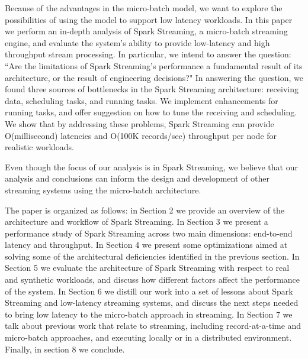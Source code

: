 
Because of the advantages in the micro-batch model, we want to explore the possibilities of using the model to support low latency workloads. In this paper we perform an in-depth analysis of Spark Streaming, a micro-batch streaming engine, and evaluate the system's ability to provide low-latency and high throughput stream processing.
In particular, we intend to answer the question: ``Are the limitations of Spark Streaming's performance a fundamental result of its architecture, or the result of engineering decisions?"
In answering the question, we found three sources of bottlenecks in the Spark Streaming architecture: receiving data, scheduling tasks, and running tasks. We implement enhancements for running tasks, and offer suggestion on how to tune the receiving and scheduling. We show that by addressing these problems, Spark Streaming can provide O(millisecond) latencies and O(100K records/sec) throughput per node for realistic workloads.

Even though the focus of our analysis is in Spark Streaming, we believe that our analysis and conclusions can inform the design and development of other streaming systems using the micro-batch architecture.

The paper is organized as follows: 
in Section 2 we provide an overview of the architecture and workflow of Spark Streaming. 
In Section 3 we present a performance study of Spark Streaming across two main dimensions: end-to-end latency and throughput.
In Section 4 we present some optimizations aimed at solving some of the architectural deficiencies identified in the previous section.
In Section 5 we evaluate the architecture of Spark Streaming with respect to real and synthetic workloads, and discuss how different factors affect the performance of the system.
In Section 6 we distill our work into a set of lessons about Spark Streaming and low-latency streaming systems, and discuss the next steps needed to bring low latency to the micro-batch approach in streaming.
In Section 7 we talk about previous work that relate to streaming, including record-at-a-time and micro-batch approaches, and executing locally or in a distributed environment.
Finally, in section 8 we conclude.
